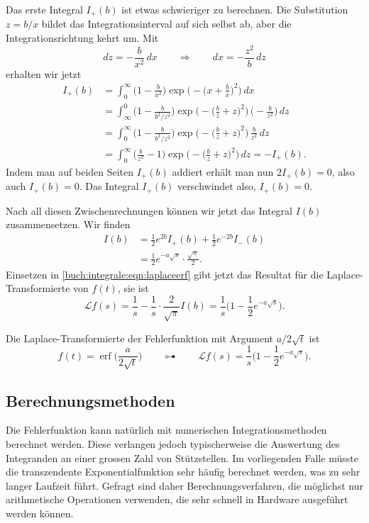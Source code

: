 Das erste Integral $I_+(b)$ ist etwas schwieriger zu berechnen.
Die Substitution $z=b/x$ bildet das Integrationsinterval auf sich selbst ab,
aber die Integrationsrichtung kehrt um.
Mit
\[
dz = -\frac{b}{x^2}\,dx
\qquad\Rightarrow\qquad
dx = -\frac{z^2}{b}\,dz
\]
erhalten wir jetzt
\begin{align*}
I_+(b)
&=
\int_0^\infty
\biggl(1-\frac{b}{x^2}\biggr)
\exp\biggl(-\biggl(x+\frac{b}{x}\biggr)^2\biggr)\,dx
\\
&=
\int_{\infty}^0
\biggl(1-\frac{b}{b^2/z^2}\biggr)
\exp\biggl(-\biggl(\frac{b}{z}+z\biggr)^2\biggr)\,
\biggl(-\frac{b}{z^2}\biggr)\,dz
\\
&=
\int_{0}^{\infty}
\biggl(1-\frac{b}{b^2/z^2}\biggr)
\exp\biggl(-\biggl(\frac{b}{z}+z\biggr)^2\biggr)\,
\frac{b}{z^2}\,dz
\\
&=
\int_{0}^{\infty}
\biggl(\frac{b}{z^2}-1\biggr)
\exp\biggl(-\biggl(\frac{b}{z}+z\biggr)^2\biggr)\,
dz
=
-I_+(b).
\end{align*}
Indem man auf beiden Seiten $I_+(b)$ addiert erhält man nun $2I_+(b)=0$,
also auch $I_+(b)=0$.
Das Integral $I_+(b)$ verschwindet also, $I_+(b)=0$.

Nach all diesen Zwischenrechnungen können wir jetzt das Integral $I(b)$
zusammensetzen.
Wir finden
\begin{align*}
I(b)
&=
\frac12e^{2b} I_+(b) +\frac12e^{-2b} I_-(b)
\\
&=
\frac12e^{-a\sqrt{s}}\cdot \frac{\sqrt{\pi}}{2}.
\end{align*}
Einsetzen in \eqref{buch:integrale:eqn:laplaceerf} gibt jetzt das
Resultat für die Laplace-Transformierte von $f(t)$, sie ist
\[
\mathscr{L}f(s)
=
\frac1s - \frac1s\cdot\frac{2}{\sqrt{\pi}} I(b)
=
\frac1s\biggl(1-\frac12e^{-a\sqrt{s}} \biggr).
\]

\begin{satz}
%
Die Laplace-Transformierte der Fehlerfunktion mit Argument
$a/2\sqrt{t}$ ist
\begin{equation}
f(t) = \operatorname{erf}\biggl(\frac{a}{2\sqrt{t}}\biggr)
\qquad\multimapdotbothA\qquad
\mathscr{L}f(s)
=
\frac1s\biggl(1-\frac12e^{-a\sqrt{s}}\biggr).
\end{equation}
\end{satz}




\subsection{Berechnungsmethoden}
Die Fehlerfunktion kann natürlich mit numerischen Integrationsmethoden
berechnet werden.
Diese verlangen jedoch typischerweise die Auswertung des Integranden
an einer grossen Zahl von Stützstellen.
Im vorliegenden Falle müsste die transzendente Exponentialfunktion
sehr häufig berechnet werden, was zu sehr langer Laufzeit führt.
Gefragt sind daher Berechnungsverfahren, die möglichst nur arithmetische
Operationen verwenden, die sehr schnell in Hardware ausgeführt werden
können.


